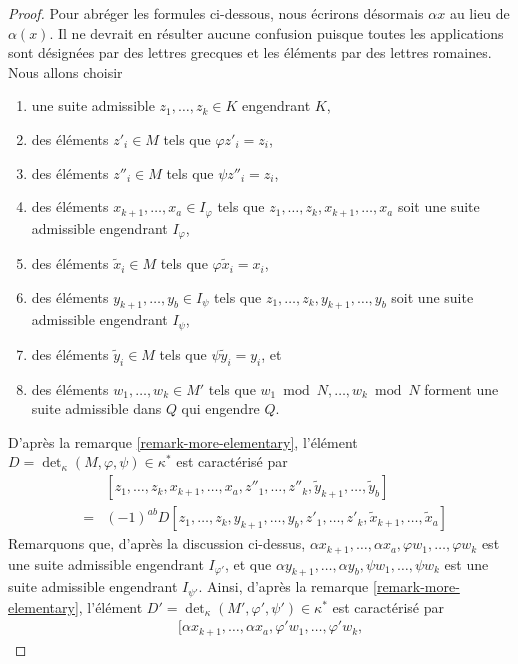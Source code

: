 \begin{proof}
\medskip\noindent
Pour abréger les formules ci-dessous, nous écrirons désormais $\alpha x$
au lieu de $\alpha(x)$. Il ne devrait en résulter aucune confusion puisque
toutes les applications sont désignées par des lettres grecques et les éléments par des lettres romaines.
Nous allons choisir
\begin{enumerate}
\item une suite admissible $z_1, \ldots, z_k \in K$
engendrant $K$,
\item des éléments $z'_i \in M$ tels que $\varphi z'_i = z_i$,
\item des éléments $z''_i \in M$ tels que $\psi z''_i = z_i$,
\item des éléments $x_{k + 1}, \ldots, x_a \in I_\varphi$ tels
que $z_1, \ldots, z_k, x_{k + 1}, \ldots, x_a$ soit une suite admissible
engendrant $I_\varphi$,
\item des éléments $\tilde x_i \in M$ tels que $\varphi \tilde x_i = x_i$,
\item des éléments $y_{k + 1}, \ldots, y_b \in I_\psi$ tels que
$z_1, \ldots, z_k, y_{k + 1}, \ldots, y_b$ soit une suite admissible
engendrant $I_\psi$,
\item des éléments $\tilde y_i \in M$ tels que $\psi \tilde y_i = y_i$, et
\item des éléments $w_1, \ldots, w_k \in M'$ tels que
$w_1 \bmod N, \ldots, w_k \bmod N$ forment une suite admissible
dans $Q$ qui engendre $Q$.
\end{enumerate}
D'après la remarque \ref{remark-more-elementary}, l'élément
$D = \det_\kappa(M, \varphi, \psi) \in \kappa^*$ est
caractérisé par
\begin{eqnarray*}
& &
[z_1, \ldots, z_k,
x_{k + 1}, \ldots, x_a,
z''_1, \ldots, z''_k,
\tilde y_{k + 1}, \ldots, \tilde y_b] \\
& = &
(-1)^{ab} D
[z_1, \ldots, z_k,
y_{k + 1}, \ldots, y_b,
z'_1, \ldots, z'_k,
\tilde x_{k + 1}, \ldots, \tilde x_a]
\end{eqnarray*}
Remarquons que, d'après la discussion ci-dessus,
$\alpha x_{k + 1}, \ldots, \alpha x_a, \varphi w_1, \ldots, \varphi w_k$
est une suite admissible engendrant $I_{\varphi'}$, et que
$\alpha y_{k + 1}, \ldots, \alpha y_b, \psi w_1, \ldots, \psi w_k$
est une suite admissible engendrant $I_{\psi'}$.
Ainsi, d'après la remarque \ref{remark-more-elementary}, l'élément
$D' = \det_\kappa(M', \varphi', \psi') \in \kappa^*$ est
caractérisé par
\begin{eqnarray*}
& &
[\alpha x_{k + 1}, \ldots, \alpha x_a,
\varphi' w_1, \ldots, \varphi' w_k,

\end{eqnarray*}
\end{proof}
